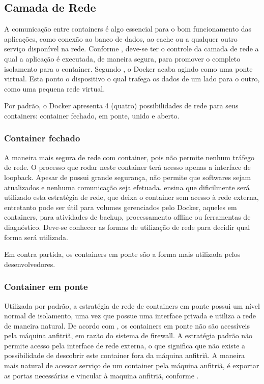 \documentclass[
	12pt,				%
	openright,			%
	oneside,			%
	a4paper,			%
	chapter=TITLE,		%
	section=TITLE,		%
	english,			%
	french,				%
	spanish,			%
	brazil				%
	]{abntex2}
\begin{document}
\subsection{Camada de Rede}

A comunicação entre containers é algo essencial para o bom funcionamento das aplicações, como conexão ao banco de dados, ao cache ou a qualquer outro serviço disponível na rede. Conforme , deve-se ter o controle da camada de rede a qual a aplicação é executada, de maneira segura, para promover o completo isolamento para o container. Segundo , o Docker acaba agindo como uma ponte virtual. Esta ponto o dispositivo o qual trafega os dados de um lado para o outro, como uma pequena rede virtual.

Por padrão, o Docker apresenta 4 (quatro) possibilidades de rede para seus containers: container fechado, em ponte, unido e aberto.

\subsubsection{Container fechado}

A maneira mais segura de rede com container, pois não permite nenhum tráfego de rede. O processo que rodar neste container terá acesso apenas a interface de loopback. Apesar de possui grande segurança, não permite que softwares sejam atualizados e nenhuma comunicação seja efetuada.  ensina que dificilmente será utilizado esta estratégia de rede, que deixa o container sem acesso à rede externa, entretanto pode ser útil para volumes gerenciados pelo Docker, aqueles em containers, para atividades de backup, processamento offline ou ferramentas de diagnóstico. Deve-se conhecer as formas de utilização de rede para decidir qual forma será utilizada.

Em contra partida, os containers em ponte são a forma mais utilizada pelos desenvolvedores.

\subsubsection{Container em ponte}

Utilizada por padrão, a estratégia de rede de containers em ponte possui um nível normal de isolamento, uma vez que possue uma interface privada e utiliza a rede de maneira natural. De acordo com , os containers em ponte não são acessíveis pela máquina anfitriã, em razão do sistema de firewall. A estratégia padrão não permite acesso pela interface de rede externa, o que significa que não existe a possibilidade de descobrir este container fora da máquina anfitriã. A maneira mais natural de acessar serviço de um container pela máquina anfitriã, é exportar as portas necessárias e vincular à maquina anfitriã, conforme .
\end{document}
